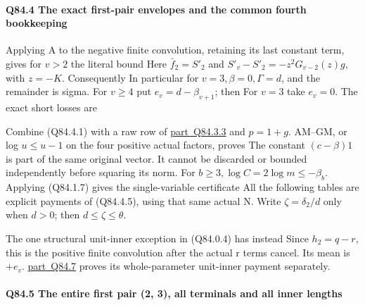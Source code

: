 \paragraph{Q84.4 The exact first-pair envelopes and the common fourth bookkeeping}

Applying A to the negative finite convolution, retaining its last constant
term, gives for \(v>2\) the literal bound
Here \(\bar f_2=S'_2\) and
\(S'_v-S'_2=-z^2G_{v-2}(z)g\), with \(z=-K\). Consequently
In particular for \(v=3,\allowbreak  \beta=0,\allowbreak  \Gamma=d\), and the remainder is sigma.
For \(v\ge 4\) put \(e_v=d-\beta_{v+1}\); then
For \(v=3\) take \(e_v=0\). The exact short losses are

Combine (Q84.4.1) with a raw row of \mbox{\hyperref[part:Q84.3.3]{part Q84.3.3}} and \(p=1+g\).
AM--GM, or log \(u\le u-1\) on the four positive actual factors, proves
The constant \((c-\beta)1\) is part of the same original vector. It
cannot be discarded or bounded independently before squaring its norm.
For \(b\ge 3,\allowbreak  \log C=2\log m\le-\beta_b\).
Applying (Q84.1.7) gives the single-variable certificate
All the following tables are explicit payments of (Q84.4.5), using that same
actual N. Write \(\zeta=\delta_2/d\) only when \(d>0\); then
\(d\le\zeta\le\theta\).

The one structural unit-inner exception in (Q84.0.4) has instead
Since \(h_2=q-r\), this is the positive finite convolution after the
actual r terms cancel. Its mean is \(+e_v\). \mbox{\hyperref[part:Q84.7]{part Q84.7}} proves its
whole-parameter unit-inner payment separately.

\paragraph{Q84.5 The entire first pair (2, 3), all terminals and all inner lengths}

